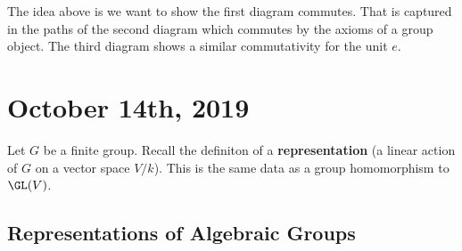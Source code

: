 \documentclass[12pt]{article}
\begin{document}
\begin{center}
\end{center}
\begin{rmk}
	The idea above is we want to show the first diagram commutes. That is captured in the paths of the second diagram which commutes by 
	the axioms of a group object. The third diagram shows a similar commutativity for the unit $e$.
\end{rmk}

\section{October 14th, 2019}
Let $G$ be a finite group. Recall the definiton of a \textbf{representation} (a linear action of $G$ on a vector space $V/k$).
This is the same data as a group homomorphism to $\GL(V)$.

\subsection{Representations of Algebraic Groups}
\end{document}
